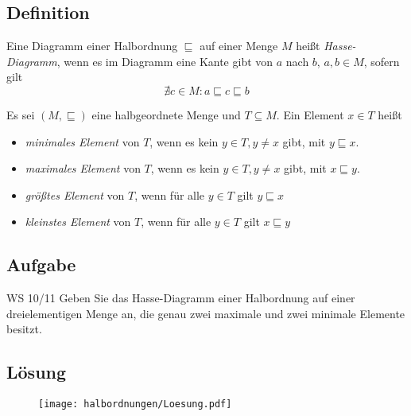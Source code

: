 \subsection{Definition}
\begin{frame}
	\begin{Definition}
		Eine Diagramm einer Halbordnung $\sqsubseteq$ auf einer Menge $M$ heißt \emph{Hasse-Diagramm}, wenn es im Diagramm eine Kante gibt von $a$ nach $b$, $a,b\in M$, sofern gilt $$ \nexists c\in M : a\sqsubseteq c \sqsubseteq b $$
	\end{Definition} \pause
	
	\begin{Definition}
		Es sei $(M,\sqsubseteq)$ eine halbgeordnete Menge und $T\subseteq M$. Ein Element $x\in T$ heißt 
		\begin{itemize}
			\item \emph{minimales Element} von $T$, wenn es kein $y\in T, y\neq x$ gibt, mit $y\sqsubseteq x$.
			\item \emph{maximales Element} von $T$, wenn es kein $y\in T, y\neq x$ gibt, mit $x\sqsubseteq y$.
			\item \emph{größtes Element} von $T$, wenn für alle $y\in T$ gilt $y\sqsubseteq x$
			\item \emph{kleinstes Element} von $T$, wenn für alle $y\in T$ gilt $x\sqsubseteq y$
		\end{itemize}
	
	\end{Definition}
\end{frame}




\subsection{Aufgabe}
\begin{frame}{WS 10/11}
	Geben Sie das Hasse-Diagramm einer Halbordnung auf einer dreielementigen Menge an, die genau zwei maximale und zwei minimale Elemente besitzt.
\end{frame}
\subsection{Lösung}
\begin{frame}
	\begin{figure}[H]
		\centering
		\texttt{[image: halbordnungen/Loesung.pdf]}
	\end{figure}
\end{frame}